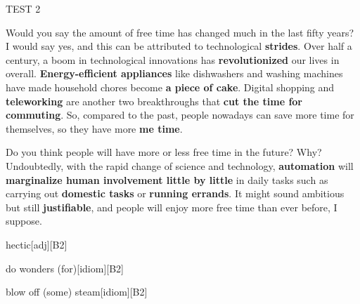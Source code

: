 \begin{glossarymc}[Cambridge 4]
\begin{test}{TEST 2}
	\begin{qa}{Would you say the amount of free time has changed much in the last fifty years?}
	I would say yes, and this can be attributed to technological \textbf{strides}. Over half a century, a boom in technological innovations has \textbf{revolutionized} our lives in overall. \textbf{Energy-efficient appliances} like dishwashers and washing machines have made household chores become \textbf{a piece of cake}. Digital shopping and \textbf{teleworking} are another two breakthroughs that \textbf{cut the time for commuting}. So, compared to the past, people nowadays can save more time for themselves, so they have more \textbf{me time}.
	\end{qa}

	\begin{qa}{Do you think people will have more or less free time in the future? Why?}
	Undoubtedly, with the rapid change of science and technology, \textbf{automation} will \textbf{marginalize human involvement little by little} in daily tasks such as carrying out \textbf{domestic tasks} or \textbf{running errands}. It might sound ambitious but still \textbf{justifiable}, and people will enjoy more free time than ever before, I suppose.
	\end{qa}

        \begin{VocabExplain}[Part 3]
			\begin{ExplainCard}{hectic}[adj][B2]
			\end{ExplainCard}

			\begin{ExplainCard}{do wonders (for)}[idiom][B2]
			\end{ExplainCard}

			\begin{ExplainCard}{blow off (some) steam}[idiom][B2]
			\end{ExplainCard}


\end{VocabExplain}
\end{test}
\end{glossarymc}
